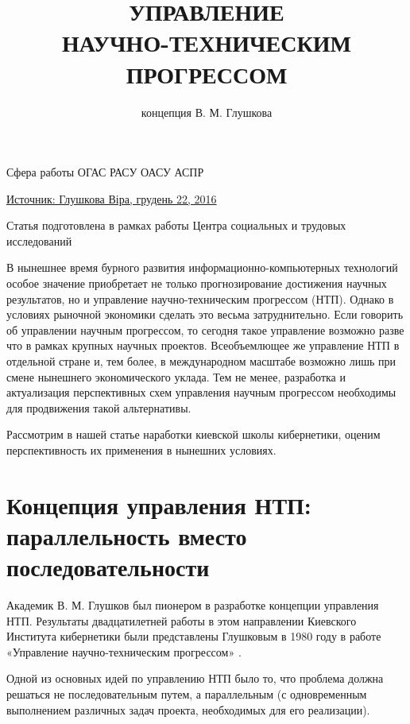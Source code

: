 
\title{УПРАВЛЕНИЕ\\НАУЧНО-ТЕХНИЧЕСКИМ\\ПРОГРЕССОМ}
\author{концепция В. М. Глушкова}

\maketitle\clearpage
\tableofcontents\clearpage

Сфера работы ОГАС РАСУ ОАСУ АСПР
 
\href{http://commons.com.ua/upravlenie-nauchno-tehnicheskim-progressom-kontseptsiya-v-m-glushkova/}{Источник:
Глушкова Віра, грудень 22, 2016}

Статья подготовлена в рамках работы Центра социальных и трудовых исследований

\bigskip

В нынешнее время бурного развития информационно-компьютерных технологий особое
значение приобретает не только прогнозирование достижения научных результатов,
но и управление научно-техническим прогрессом (НТП). Однако в условиях рыночной
экономики сделать это весьма затруднительно. Если говорить об управлении научным
прогрессом, то сегодня такое управление возможно разве что в рамках крупных
научных проектов. Всеобъемлющее же управление НТП в отдельной стране и, тем
более, в международном масштабе возможно лишь при смене нынешнего экономического
уклада. Тем не менее, разработка и актуализация перспективных схем управления
научным прогрессом необходимы для продвижения такой альтернативы.
 
Рассмотрим в нашей статье наработки киевской школы кибернетики, оценим
перспективность их применения в нынешних условиях.
 
\section{Концепция управления НТП:\\параллельность вместо последовательности}
 
Академик В. М. Глушков был пионером в разработке концепции управления НТП.
Результаты двадцатилетней работы в этом направлении Киевского Института
кибернетики были представлены Глушковым в 1980 году в работе «Управление
научно-техническим прогрессом» \cite{b1}.
 
Одной из основных идей по управлению НТП было то, что проблема должна решаться
не последовательным путем, а параллельным (с одновременным выполнением различных
задач проекта, необходимых для его реализации).
 
